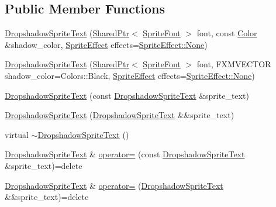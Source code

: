 \subsection*{Public Member Functions}
\begin{DoxyCompactItemize}
\item 
\hyperlink{classmage_1_1_dropshadow_sprite_text_af9580cd770e5dad0b3d5a9299c0a7522}{Dropshadow\+Sprite\+Text} (\hyperlink{namespacemage_a1e01ae66713838a7a67d30e44c67703e}{Shared\+Ptr}$<$ \hyperlink{classmage_1_1_sprite_font}{Sprite\+Font} $>$ font, const \hyperlink{structmage_1_1_color}{Color} \&shadow\+\_\+color, \hyperlink{namespacemage_a9cfe18123066ba4236f548f9de75d881}{Sprite\+Effect} effects=\hyperlink{namespacemage_a5e7e18b0154373ce8fc942fe3f6b27fda6adf97f83acf6453d4a6a4b1070f3754}{Sprite\+Effect\+::\+None})
\item 
\hyperlink{classmage_1_1_dropshadow_sprite_text_ad572ec34643bb332ecea712d5dc0f625}{Dropshadow\+Sprite\+Text} (\hyperlink{namespacemage_a1e01ae66713838a7a67d30e44c67703e}{Shared\+Ptr}$<$ \hyperlink{classmage_1_1_sprite_font}{Sprite\+Font} $>$ font, F\+X\+M\+V\+E\+C\+T\+OR shadow\+\_\+color=Colors\+::\+Black, \hyperlink{namespacemage_a9cfe18123066ba4236f548f9de75d881}{Sprite\+Effect} effects=\hyperlink{namespacemage_a5e7e18b0154373ce8fc942fe3f6b27fda6adf97f83acf6453d4a6a4b1070f3754}{Sprite\+Effect\+::\+None})
\item 
\hyperlink{classmage_1_1_dropshadow_sprite_text_af0a9422a32ed8962d6c691fe76f44c30}{Dropshadow\+Sprite\+Text} (const \hyperlink{classmage_1_1_dropshadow_sprite_text}{Dropshadow\+Sprite\+Text} \&sprite\+\_\+text)
\item 
\hyperlink{classmage_1_1_dropshadow_sprite_text_a238b873f7b4d818cc3640e8f363f760e}{Dropshadow\+Sprite\+Text} (\hyperlink{classmage_1_1_dropshadow_sprite_text}{Dropshadow\+Sprite\+Text} \&\&sprite\+\_\+text)
\item 
virtual \hyperlink{classmage_1_1_dropshadow_sprite_text_a561b1be59d05bccb680969be792c0e28}{$\sim$\+Dropshadow\+Sprite\+Text} ()
\item 
\hyperlink{classmage_1_1_dropshadow_sprite_text}{Dropshadow\+Sprite\+Text} \& \hyperlink{classmage_1_1_dropshadow_sprite_text_a83846227264396ee5b6ca44304bc404a}{operator=} (const \hyperlink{classmage_1_1_dropshadow_sprite_text}{Dropshadow\+Sprite\+Text} \&sprite\+\_\+text)=delete
\item 
\hyperlink{classmage_1_1_dropshadow_sprite_text}{Dropshadow\+Sprite\+Text} \& \hyperlink{classmage_1_1_dropshadow_sprite_text_aea70f005fd9eae94aee9da27aa54534b}{operator=} (\hyperlink{classmage_1_1_dropshadow_sprite_text}{Dropshadow\+Sprite\+Text} \&\&sprite\+\_\+text)=delete

\end{DoxyCompactItemize}
